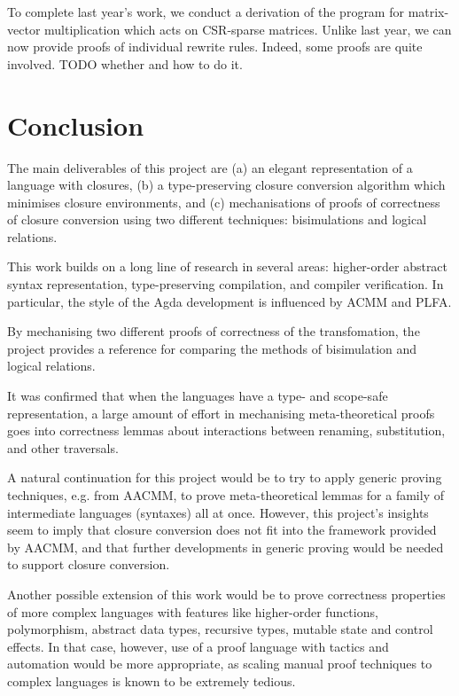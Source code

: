 \documentclass[bsc,frontabs,oneside,singlespacing,parskip,deptreport]{infthesis}
\theoremstyle{definition}
\theoremstyle{lemma}
\begin{document}
To complete last year's work, we conduct a derivation of the program
for matrix-vector multiplication which acts on CSR-sparse
matrices. Unlike last year, we can now provide proofs of individual
rewrite rules. Indeed, some proofs are quite involved. TODO whether
and how to do it.

\chapter{Conclusion}
\label{cha:conclusion}

The main deliverables of this project are (a) an elegant
representation of a language with closures, (b) a type-preserving
closure conversion algorithm which minimises closure environments, and
(c) mechanisations of proofs of correctness of closure conversion
using two different techniques: bisimulations and logical relations.

This work builds on a long line of research in several areas:
higher-order abstract syntax representation, type-preserving
compilation, and compiler verification. In particular, the style of
the Agda development is influenced by ACMM and PLFA.

By mechanising two different proofs of correctness of the
transfomation, the project provides a reference for comparing the
methods of bisimulation and logical relations.

It was confirmed that when the languages have a type- and scope-safe
representation, a large amount of effort in mechanising
meta-theoretical proofs goes into correctness lemmas about
interactions between renaming, substitution, and other traversals.

A natural continuation for this project would be to try to apply
generic proving techniques, e.g. from AACMM, to prove meta-theoretical
lemmas for a family of intermediate languages (syntaxes) all at
once. However, this project's insights seem to imply that closure
conversion does not fit into the framework provided by AACMM, and that
further developments in generic proving would be needed to support
closure conversion.

Another possible extension of this work would be to prove correctness
properties of more complex languages with features like higher-order
functions, polymorphism, abstract data types, recursive types, mutable
state and control effects. In that case, however, use of a proof
language with tactics and automation would be more appropriate, as
scaling manual proof techniques to complex languages is known to be
extremely tedious.
\end{document}
